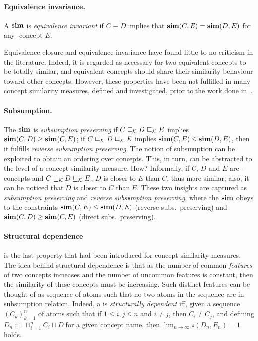 \paragraph{Equivalence invariance.}
A \csm \(\operatorname{\mathbf{sim}}\) is \emph{equivalence invariant} if \(C \equiv D\) implies that \(\operatorname{\mathbf{sim}}(C,E) = \operatorname{\mathbf{sim}}(D,E)\) for any \elh-concept \(E\).

Equivalence closure and equivalence invariance have found little to no criticism in the literature.
Indeed, it is regarded as necessary for two equivalent concepts to be totally similar, and equivalent concepts should share their similarity behaviour toward other concepts.
However, these properties have been not fulfilled in many concept similarity measures, defined and investigated, prior to the work done in~\cite{LeTu12}.

  \paragraph{Subsumption.}
  The \csm \(\operatorname{\mathbf{sim}}\) is \emph{subsumption preserving} if \(C \sqsubseteq_{\mathcal{K}} D \sqsubseteq_{\mathcal{K}} E\) implies \(\operatorname{\mathbf{sim}}(C,D)  \ge \operatorname{\mathbf{sim}}(C,E)\); if \(C \sqsubseteq_{\mathcal{K}} D \sqsubseteq_{\mathcal{K}} E\) implies \(\operatorname{\mathbf{sim}}(C,E) \le \operatorname{\mathbf{sim}}(D,E)\), then it fulfills \emph{reverse subsumption preserving}.
  The notion of subsumption can be exploited to obtain an ordering over concepts.
  This, in turn, can be abstracted to the level of a concept similarity measure. How?
  Informally, if \(C\), \(D\) and \(E\) are \elh-concepts and \(C \sqsubseteq_{\mathcal{K}} D \sqsubseteq_{\mathcal{K}} E\), \(D\) is closer to \(E\) than \(C\), thus more similar;
  also, it can be noticed that \(D\) is closer to \(C\) than \(E\).
  These two insights are captured as \emph{subsumption preserving} and \emph{reverse subsumption preserving}, where the \csm \(\operatorname{\mathbf{sim}}\) obeys to the constraints \(\operatorname{\mathbf{sim}}(C,E) \le \operatorname{\mathbf{sim}}(D,E)\) (reverse subs.\ preserving) and \(\operatorname{\mathbf{sim}}(C,D) \ge \operatorname{\mathbf{sim}}(C,E)\) (direct subs.\ preserving).

  \paragraph{Structural dependence} is the last property that had been introduced for concept similarity measures.
  The idea behind structural dependence is that as the number of common \emph{features} of two concepts increases and the number of uncommon features is constant, then the similarity of these concepts must be increasing.
  Such distinct features can be thought of as sequence of atoms such that no two atoms in the sequence are in subsumption relation.
  Indeed, a \csm is \emph{structurally dependent} iff, given a sequence \({(C_k)}_{k=1}^n\) of atoms such that if \(1 \le i,j \le n\) and \(i \ne j\), then \(C_i \not\sqsubseteq C_j\), and defining \(D_n := \sqcap_{i=1}^n C_i \sqcap D\) for a given concept name, then \(\lim_{n \to \infty}s(D_n,E_n) = 1\) holds.
